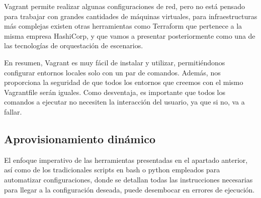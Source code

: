 %
%
%
	
	Vagrant permite realizar algunas configuraciones de red, pero no está pensado para trabajar con grandes cantidades de máquinas virtuales, para infraestructuras más complejas existen otras herramientas como Terraform que pertenece a la misma empresa HashiCorp, y que vamos a presentar posteriormente como una de las tecnologías de orquestación de escenarios.

        En resumen, Vagrant es muy fácil de instalar y utilizar, permitiéndonos configurar entornos locales solo con un par de comandos. Además, nos proporciona la seguridad de que todos los entornos que creemos con el mismo Vagrantfile serán iguales. Como desventaja, es importante que todos los comandos a ejecutar no necesiten la interacción del usuario, ya que si no, va a fallar.

	\clearpage

\subsection{Aprovisionamiento dinámico} \label{sec:din}
	El enfoque imperativo de las herramientas presentadas en el apartado anterior, así como de los tradicionales scripts en bash o python empleados para automatizar configuraciones, donde se detallan todas las instrucciones necesarias para llegar a la configuración deseada, puede desembocar en errores de ejecución. 

